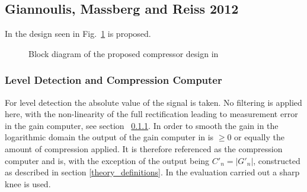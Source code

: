 \documentclass[../main2.tex]{subfiles}
\providecommand{\rootdir}{..}
\begin{document}
\subsection{Giannoulis, Massberg and Reiss 2012}
In \cite{reiss2012tutorial} the design seen in Fig.~\ref{fig:block_reiss_theory} is proposed.
\begin{figure}
\centerline{}
\caption{Block diagram of the proposed compressor design in \cite{reiss2012tutorial}}
\label{fig:block_reiss_theory}
\end{figure}
\subsubsection{Level Detection and Compression Computer}
For level detection the absolute value of the signal is taken. No filtering is applied here, with the non-linearity of the full rectification leading to measurement error in the gain computer, see section ~\ref{}. In order to smooth the gain in the logarithmic domain the output of the gain computer in \cite{reiss2012tutorial} is $\geq 0$ or equally the amount of compression applied. It is therefore referenced as the compression computer and is, with the exception of the output being $C'_n = |G'_n|$, constructed as described in section \ref{theory_definitions}. In the evaluation carried out a sharp knee is used. 
\end{document}
